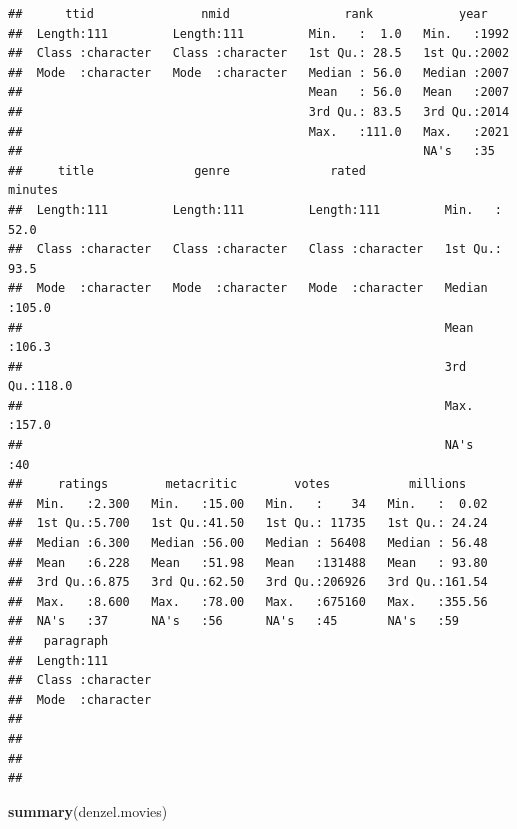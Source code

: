 \documentclass[]{article}
\newenvironment{Shaded}{\begin{snugshade}}{\end{snugshade}}
\newcommand{\KeywordTok}[1]{\textcolor[rgb]{0.13,0.29,0.53}{\textbf{#1}}}
\newcommand{\NormalTok}[1]{#1}
\begin{document}
\begin{verbatim}
##      ttid               nmid                rank            year     
##  Length:111         Length:111         Min.   :  1.0   Min.   :1992  
##  Class :character   Class :character   1st Qu.: 28.5   1st Qu.:2002  
##  Mode  :character   Mode  :character   Median : 56.0   Median :2007  
##                                        Mean   : 56.0   Mean   :2007  
##                                        3rd Qu.: 83.5   3rd Qu.:2014  
##                                        Max.   :111.0   Max.   :2021  
##                                                        NA's   :35    
##     title              genre              rated              minutes     
##  Length:111         Length:111         Length:111         Min.   : 52.0  
##  Class :character   Class :character   Class :character   1st Qu.: 93.5  
##  Mode  :character   Mode  :character   Mode  :character   Median :105.0  
##                                                           Mean   :106.3  
##                                                           3rd Qu.:118.0  
##                                                           Max.   :157.0  
##                                                           NA's   :40     
##     ratings        metacritic        votes           millions     
##  Min.   :2.300   Min.   :15.00   Min.   :    34   Min.   :  0.02  
##  1st Qu.:5.700   1st Qu.:41.50   1st Qu.: 11735   1st Qu.: 24.24  
##  Median :6.300   Median :56.00   Median : 56408   Median : 56.48  
##  Mean   :6.228   Mean   :51.98   Mean   :131488   Mean   : 93.80  
##  3rd Qu.:6.875   3rd Qu.:62.50   3rd Qu.:206926   3rd Qu.:161.54  
##  Max.   :8.600   Max.   :78.00   Max.   :675160   Max.   :355.56  
##  NA's   :37      NA's   :56      NA's   :45       NA's   :59      
##   paragraph        
##  Length:111        
##  Class :character  
##  Mode  :character  
##                    
##                    
##                    
## 
\end{verbatim}

\begin{Shaded}
\begin{Highlighting}[]
\KeywordTok{summary}\NormalTok{(denzel.movies)}
\end{Highlighting}
\end{Shaded}
\end{document}
